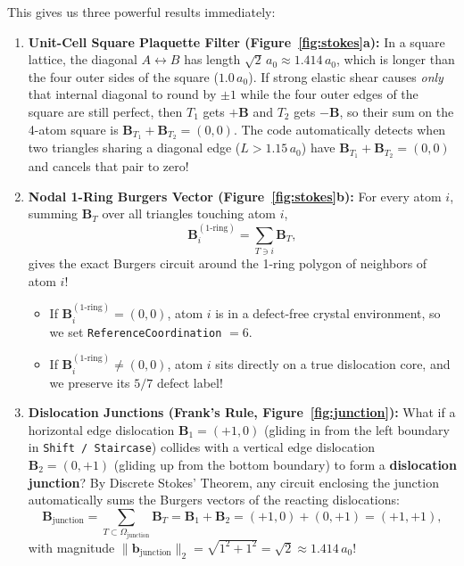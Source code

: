 \documentclass[11pt,a4paper]{article}
\newcommand{\code}[1]{\texttt{#1}}
\begin{document}
This gives us three powerful results immediately:
\begin{enumerate}
  \item \textbf{Unit-Cell Square Plaquette Filter (Figure~\ref{fig:stokes}a):}
        In a square lattice, the diagonal $A \leftrightarrow B$ has length $\sqrt{2}\,a_0 \approx 1.414\,a_0$, which is longer than the four outer sides of the square ($1.0\,a_0$). If strong elastic shear causes \emph{only} that internal diagonal to round by $\pm 1$ while the four outer edges of the square are still perfect, then $T_1$ gets $+\bm{B}$ and $T_2$ gets $-\bm{B}$, so their sum on the 4-atom square is $\bm{B}_{T_1} + \bm{B}_{T_2} = (0,0)$. The code automatically detects when two triangles sharing a diagonal edge ($L > 1.15\,a_0$) have $\bm{B}_{T_1} + \bm{B}_{T_2} = (0,0)$ and cancels that pair to zero!
  \item \textbf{Nodal 1-Ring Burgers Vector (Figure~\ref{fig:stokes}b):}
        For every atom $i$, summing $\bm{B}_T$ over all triangles touching atom $i$,
        \begin{equation}
          \bm{B}_i^{(1\text{-ring})} = \sum_{T \ni i} \bm{B}_T,
        \end{equation}
        gives the exact Burgers circuit around the 1-ring polygon of neighbors of atom $i$!
        \begin{itemize}[noitemsep]
          \item If $\bm{B}_i^{(1\text{-ring})} = (0,0)$, atom $i$ is in a defect-free crystal environment, so we set \code{ReferenceCoordination} $= 6$.
          \item If $\bm{B}_i^{(1\text{-ring})} \neq (0,0)$, atom $i$ sits directly on a true dislocation core, and we preserve its $5/7$ defect label!
        \end{itemize}
  \item \textbf{Dislocation Junctions (Frank's Rule, Figure~\ref{fig:junction}):}
        What if a horizontal edge dislocation $\bm{B}_1 = (+1, 0)$ (gliding in from the left boundary in \code{Shift / Staircase}) collides with a vertical edge dislocation $\bm{B}_2 = (0, +1)$ (gliding up from the bottom boundary) to form a \textbf{dislocation junction}?
        By Discrete Stokes' Theorem, any circuit enclosing the junction automatically sums the Burgers vectors of the reacting dislocations:
        \begin{equation}
          \bm{B}_{\mathrm{junction}} = \sum_{T \subset \Omega_{\mathrm{junction}}} \bm{B}_T = \bm{B}_1 + \bm{B}_2 = (+1, 0) + (0, +1) = (+1, +1),
        \end{equation}
        with magnitude $\|\bm{b}_{\mathrm{junction}}\|_2 = \sqrt{1^2 + 1^2} = \sqrt{2} \approx 1.414\,a_0$!
\end{enumerate}
\end{document}
